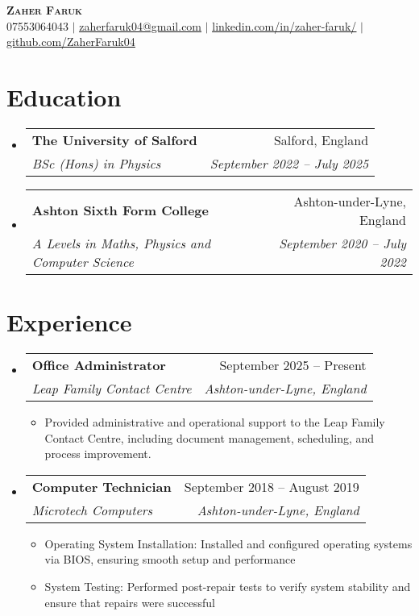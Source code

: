 \documentclass[letterpaper,11pt]{article}
\makeatletter
\newcommand{\resumeItem}[1]{
  \item\small{
    {#1 \vspace{-2pt}}
  }
}
\newcommand{\resumeSubheading}[4]{
  \vspace{-2pt}\item
    \begin{tabular*}{0.97\textwidth}[t]{l@{\extracolsep{\fill}}r}
      \textbf{#1} & #2 \\
      \textit{\small#3} & \textit{\small #4} \\
    \end{tabular*}\vspace{-7pt}
}
\newcommand{\resumeSubHeadingListStart}{\begin{itemize}[leftmargin=0.15in, label={}]}
\newcommand{\resumeSubHeadingListEnd}{\end{itemize}}
\newcommand{\resumeItemListStart}{\begin{itemize}}
\newcommand{\resumeItemListEnd}{\end{itemize}\vspace{-5pt}}
\makeatother
\begin{document}
\begin{center}
    \textbf{\Huge \scshape Zaher Faruk} \\ \vspace{1pt}
    \small 07553064043 $|$ \href{mailto:zaherfaruk@gmail.com}{\underline{zaherfaruk04@gmail.com}} $|$ 
    \href{https://www.linkedin.com/in/zaher-faruk/}{\underline{linkedin.com/in/zaher-faruk/}} $|$
    \href{https://github.com/ZaherFaruk04}{\underline{github.com/ZaherFaruk04}}
\end{center}

\section{Education}
  \resumeSubHeadingListStart
    \resumeSubheading
      {The University of Salford}{Salford, England}
      {BSc (Hons) in Physics}{September 2022 -- July 2025}
    \resumeSubheading
      {Ashton Sixth Form College}{Ashton-under-Lyne, England }
      {A Levels in Maths, Physics and Computer Science}{September 2020 -- July 2022}
  \resumeSubHeadingListEnd
\section{Experience}
  \resumeSubHeadingListStart
 \resumeSubheading
      {Office Administrator }{September 2025 -- Present}
      {Leap Family Contact Centre} {Ashton-under-Lyne, England}
      \resumeItemListStart
        \resumeItem{Provided administrative and operational support to the Leap Family Contact Centre, including document management, scheduling, and process improvement.}

    \resumeItemListEnd

 \resumeSubheading
      {Computer Technician}{September 2018 -- August 2019}
      {Microtech Computers} {Ashton-under-Lyne, England}
      \resumeItemListStart
        \resumeItem{Operating System Installation: Installed and configured operating systems via BIOS, ensuring smooth setup and performance}
        \resumeItem{System Testing: Performed post-repair tests to verify system stability and ensure that repairs were successful }
    \resumeItemListEnd
  \resumeSubHeadingListEnd


  
\end{document}
